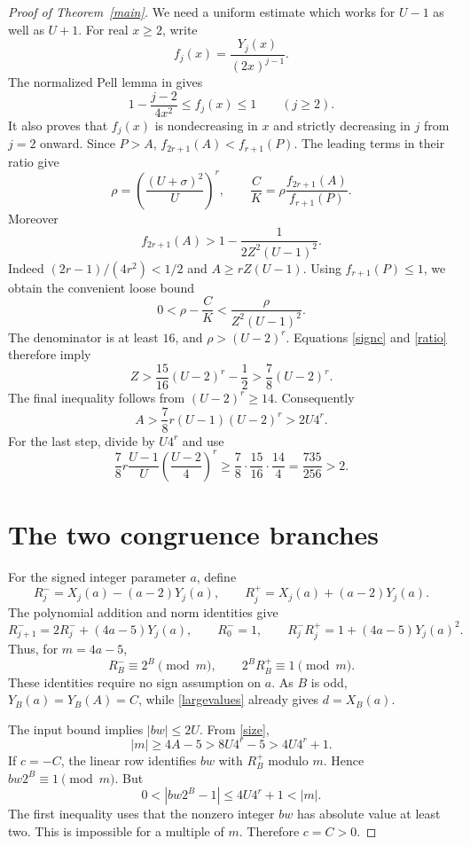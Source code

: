 \documentclass[11pt]{article}
\begin{document}
\begin{proof}[Proof of Theorem~\ref{main}]
We need a uniform estimate which works for \(U-1\) as well as \(U+1\).
For real \(x\ge2\), write
\[
 f_j(x)=\frac{Y_j(x)}{(2x)^{j-1}}.
\]
The normalized Pell lemma in \cite{Binomial} gives
\[
 1-\frac{j-2}{4x^2}\le f_j(x)\le1\qquad(j\ge2).
\]
It also proves that \(f_j(x)\) is nondecreasing in \(x\) and
strictly decreasing in \(j\) from \(j=2\) onward. Since \(P>A\),
\(f_{2r+1}(A)<f_{r+1}(P)\). The leading terms in their ratio give
\[
 \rho=\left(\frac{(U+\sigma)^2}{U}\right)^r,
 \qquad \frac CK=\rho\frac{f_{2r+1}(A)}{f_{r+1}(P)}.
\]
Moreover
\[
 f_{2r+1}(A)>1-\frac{1}{2Z^2(U-1)^2}.
\]
Indeed \((2r-1)/(4r^2)<1/2\) and \(A\ge rZ(U-1)\).
Using \(f_{r+1}(P)\le1\), we obtain the convenient loose bound
\begin{equation}\label{ratio}
 0<\rho-\frac CK<\frac{\rho}{Z^2(U-1)^2}.
\end{equation}
The denominator is at least \(16\), and
\(\rho>(U-2)^r\). Equations \eqref{signc} and \eqref{ratio}
therefore imply
\[
 Z>\frac{15}{16}(U-2)^r-\frac12
   >\frac78(U-2)^r.
\]
The final inequality follows from \((U-2)^r\ge14\).
Consequently
\begin{equation}\label{size}
 A>\frac78 r(U-1)(U-2)^r>2U4^r.
\end{equation}
For the last step, divide by \(U4^r\) and use
\[
 \frac78r\frac{U-1}{U}\left(\frac{U-2}{4}\right)^r
 \ge\frac78\cdot\frac{15}{16}\cdot\frac{14}{4}
 =\frac{735}{256}>2.
\]

\section*{The two congruence branches}

For the signed integer parameter \(a\), define
\[
 R_j^-=X_j(a)-(a-2)Y_j(a),\qquad
 R_j^+=X_j(a)+(a-2)Y_j(a).
\]
The polynomial addition and norm identities give
\begin{equation}\label{congruences}
 R_{j+1}^-=2R_j^-+(4a-5)Y_j(a),\qquad R_0^-=1,
 \qquad R_j^-R_j^+=1+(4a-5)Y_j(a)^2.
\end{equation}
Thus, for \(m=4a-5\),
\[
 R_B^-\equiv2^B\pmod m,\qquad
 2^B R_B^+\equiv1\pmod m.
\]
These identities require no sign assumption on \(a\).
As \(B\) is odd, \(Y_B(a)=Y_B(A)=C\), while
\eqref{largevalues} already gives \(d=X_B(a)\).

The input bound implies \(|bw|\le2U\). From \eqref{size},
\begin{equation}\label{modulusbound}
 |m|\ge4A-5>8U4^r-5>4U4^r+1.
\end{equation}
If \(c=-C\), the linear row identifies \(bw\) with
\(R_B^+\) modulo \(m\). Hence
\(bw2^B\equiv1\pmod m\). But
\[
 0<|bw2^B-1|\le4U4^r+1<|m|.
\]
The first inequality uses that the nonzero integer \(bw\) has
absolute value at least two. This is impossible for a multiple of
\(m\). Therefore \(c=C>0\).


\end{proof}
\end{document}
